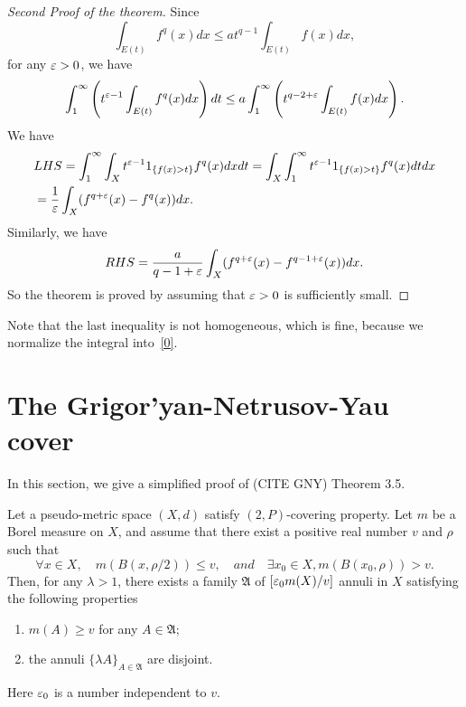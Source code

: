 \begin{proof}[Second Proof of the theorem] Since
\[
\int_{E(t)}f^q(x)dx\leq at^{q-1}\int_{E(t)} f(x) dx,
\]
for any $\varepsilon>0$, we have
\[
\int_1^\infty\left(t^{\varepsilon-1}\int_{E(t)}f^q(x)dx\right) dt\leq a \int_1^\infty\left(t^{q-2+\varepsilon}\int_{E(t)} f(x) dx
\right).
\]
We have
\[
\begin{split}
&
LHS=\int_1^\infty\int_X t^{\varepsilon-1}1_{\{f(x)>t\}}f^q(x) dxdt
=\int_X\int_1^\infty t^{\varepsilon-1}1_{\{f(x)>t\}}f^q(x) dtdx\\
&=\frac{1}{\varepsilon}\int_X (f^{q+\varepsilon}(x)-f^q(x))dx.
\end{split}
\]
Similarly, we have
\[
RHS=\frac{a}{q-1+\varepsilon}\int_X(f^{q+\varepsilon}(x)-f^{q-1+\varepsilon}(x))dx.
\]
So the theorem is proved by assuming that $\varepsilon>0$ is sufficiently small.
\end{proof}

\begin{remark} Note that the last inequality is not homogeneous, which is fine, because we normalize the integral into~\eqref{0}.
\end{remark}




 
 \section{The Grigor'yan-Netrusov-Yau cover}\label{GNY_cover}
In this section, we give a simplified proof of (CITE GNY) {Theorem 3.5}. 

\begin{theorem}
Let a pseudo-metric space $(X,d)$ satisfy $(2,P)$-covering property. Let $m$ be a Borel measure on $X$, and assume that there exist a positive real number $v$ and $\rho$ such that 
\begin{equation}\label{1a}
\forall x\in X,\quad m(B(x,\rho/2))\leq v,\quad and\quad \exists x_0\in X, m(B(x_0,\rho))>v.
\end{equation}
Then, for any $\lambda>1$, there exists a family $\mathfrak A$ of $[\varepsilon_0m(X)/v]$ annuli 
in $X$ satisfying the following properties
\begin{enumerate}
\item $m(A)\geq v$ for any $A\in\mathfrak A$;
\item the annuli $\{\lambda A\}_{A\in\mathfrak A}$ are disjoint. 
\end{enumerate}
Here $\varepsilon_0$ is a number independent to $v$.
\end{theorem}






